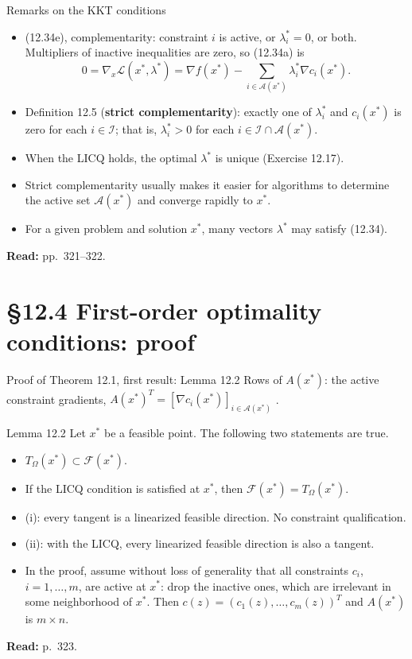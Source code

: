 \documentclass[aspectratio=169,12pt]{beamer}
\newcommand{\xs}{x^{*}}
\newcommand{\gradf}{\nabla f}
\newcommand{\eqn}[1]{\text{\small(#1)}}
\newcommand{\readbook}[1]{{\color{red}\textbf{Read:} #1}}
\newcommand{\ls}{\lambda^{*}}
\newcommand{\cA}{\mathcal{A}}
\newcommand{\cF}{\mathcal{F}}
\newcommand{\cI}{\mathcal{I}}
\newcommand{\cL}{\mathcal{L}}
\newcommand{\TO}{T_{\Omega}}
\begin{document}
\begin{frame}{Remarks on the KKT conditions}
  \begin{itemize}\setlength\itemsep{0.5em}
    \item (12.34e), complementarity: constraint $i$ is active, or $\ls_{i}=0$, or both. Multipliers of
      inactive inequalities are zero, so (12.34a) is
      \[ 0=\nabla_{x}\cL(\xs,\ls)=\gradf(\xs)-\sum_{i\in\cA(\xs)}\ls_{i}\nabla c_{i}(\xs) . \tag{12.35} \]
    \item Definition 12.5 (\textbf{strict complementarity}): exactly one of $\ls_{i}$ and $c_{i}(\xs)$
      is zero for each $i\in\cI$; that is, $\ls_{i}>0$ for each $i\in\cI\cap\cA(\xs)$.
    \item When the LICQ holds, the optimal $\ls$ is unique (Exercise 12.17).
    \item Strict complementarity usually makes it easier for algorithms to determine the active
      set $\cA(\xs)$ and converge rapidly to $\xs$.
    \item For a given problem and solution $\xs$, many vectors $\ls$ may satisfy (12.34).
  \end{itemize}
  \readbook{pp.~321--322.}
\end{frame}

\section{\S12.4 First-order optimality conditions: proof}

\begin{frame}{Proof of Theorem 12.1, first result: Lemma 12.2}
  Rows of $A(\xs)$: the active constraint gradients,
  $A(\xs)^{T}=[\nabla c_{i}(\xs)]_{i\in\cA(\xs)}$ \eqn{12.37}.
  \begin{block}{Lemma 12.2}
    Let $\xs$ be a feasible point. The following two statements are true.
    \begin{itemize}
      \item[(i)] $\TO(\xs)\subset\cF(\xs)$.
      \item[(ii)] If the LICQ condition is satisfied at $\xs$, then $\cF(\xs)=\TO(\xs)$.
    \end{itemize}
  \end{block}
  \begin{itemize}\setlength\itemsep{0.4em}
    \item (i): every tangent is a linearized feasible direction. No constraint qualification.
    \item (ii): with the LICQ, every linearized feasible direction is also a tangent.
    \item In the proof, assume without loss of generality that all constraints $c_{i}$, $i=1,\dots,m$,
      are active at $\xs$: drop the inactive ones, which are irrelevant in some neighborhood of $\xs$.
      Then $c(z)=(c_{1}(z),\dots,c_{m}(z))^{T}$ and $A(\xs)$ is $m\times n$.
  \end{itemize}
  \readbook{p.~323.}
\end{frame}
\end{document}
